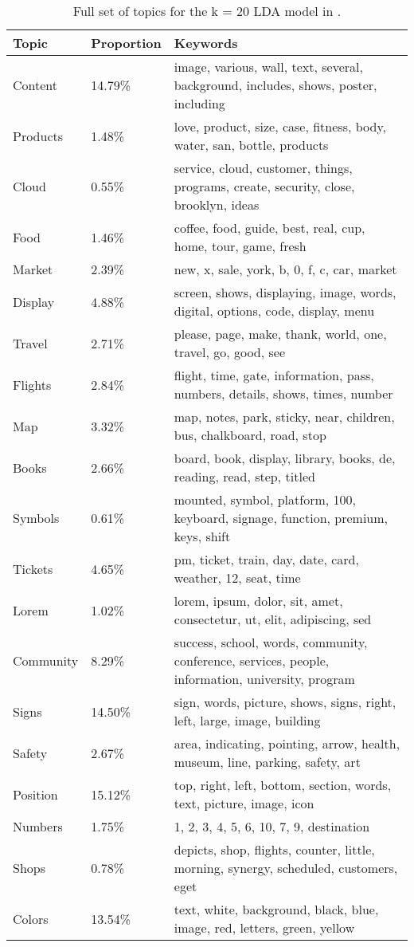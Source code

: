 \begin{table*}[h!]
\centering
\caption{Full set of topics for the k = 20 LDA model in \DatasetName.}
\begin{tabular}{|l|l|p{10cm}|}
\hline
\textbf{Topic} & \textbf{Proportion} & \textbf{Keywords} \\ \hline
Content & 14.79\% & image, various, wall, text, several, background, includes, shows, poster, including \\ \hline
Products & 1.48\% & love, product, size, case, fitness, body, water, san, bottle, products \\ \hline
Cloud & 0.55\% & service, cloud, customer, things, programs, create, security, close, brooklyn, ideas \\ \hline
Food & 1.46\% & coffee, food, guide, best, real, cup, home, tour, game, fresh \\ \hline
Market & 2.39\% & new, x, sale, york, b, 0, f, c, car, market \\ \hline
Display & 4.88\% & screen, shows, displaying, image, words, digital, options, code, display, menu \\ \hline
Travel & 2.71\% & please, page, make, thank, world, one, travel, go, good, see \\ \hline
Flights & 2.84\% & flight, time, gate, information, pass, numbers, details, shows, times, number \\ \hline
Map & 3.32\% & map, notes, park, sticky, near, children, bus, chalkboard, road, stop \\ \hline
Books & 2.66\% & board, book, display, library, books, de, reading, read, step, titled \\ \hline
Symbols & 0.61\% & mounted, symbol, platform, 100, keyboard, signage, function, premium, keys, shift \\ \hline
Tickets & 4.65\% & pm, ticket, train, day, date, card, weather, 12, seat, time \\ \hline
Lorem & 1.02\% & lorem, ipsum, dolor, sit, amet, consectetur, ut, elit, adipiscing, sed \\ \hline
Community & 8.29\% & success, school, words, community, conference, services, people, information, university, program \\ \hline
Signs & 14.50\% & sign, words, picture, shows, signs, right, left, large, image, building \\ \hline
Safety & 2.67\% & area, indicating, pointing, arrow, health, museum, line, parking, safety, art \\ \hline
Position & 15.12\% & top, right, left, bottom, section, words, text, picture, image, icon \\ \hline
Numbers & 1.75\% & 1, 2, 3, 4, 5, 6, 10, 7, 9, destination \\ \hline
Shops & 0.78\% & depicts, shop, flights, counter, little, morning, synergy, scheduled, customers, eget \\ \hline
Colors & 13.54\% & text, white, background, black, blue, image, red, letters, green, yellow \\ \hline
\end{tabular}
\label{tab:lda_topics_full}
\end{table*}